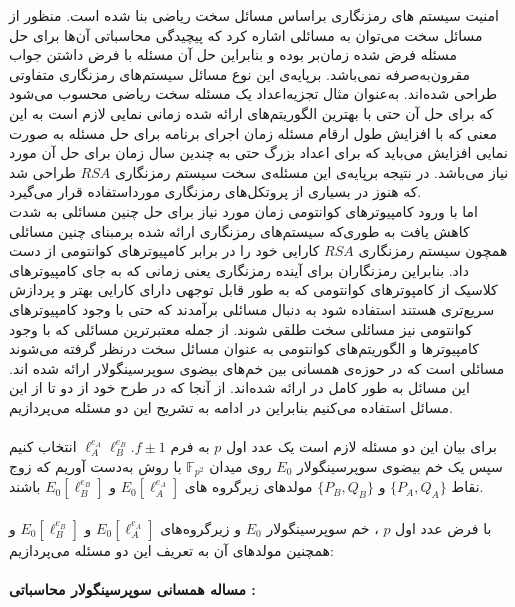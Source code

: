 
امنیت سیستم های رمزنگاری براساس مسائل سخت ریاضی بنا شده است. منظور از مسائل سخت می‌توان به مسائلی اشاره کرد که پیچیدگی محاسباتی آن‌ها برای حل مسئله فرض شده زمان‌بر بوده و بنابراین حل آن مسئله با فرض داشتن جواب مقرون‌به‌صرفه نمی‌باشد. برپایه‌ی این نوع مسائل سیستم‌های رمزنگاری متفاوتی طراحی  شده‌اند. به‌عنوان مثال تجزیه‌اعداد یک مسئله سخت ریاضی محسوب می‌شود که برای حل آن حتی با بهترین الگوریتم‌های ارائه شده زمانی نمایی لازم است به این معنی که با افزایش طول ارقام مسئله زمان اجرای برنامه برای حل مسئله به صورت نمایی افزایش می‌باید که برای اعداد بزرگ حتی به چندین سال زمان برای حل آن مورد نیاز می‌باشد.  در نتیجه برپایه‌ی این مسئله‌ی سخت سیستم رمزنگاری
$RSA$
طراحی شد که هنوز در بسیاری از پروتکل‌های رمزنگاری مورداستفاده قرار می‌گیرد. 
\\
اما با ورود کامپیوترهای کوانتومی زمان مورد نیاز برای حل چنین مسائلی به شدت کاهش یافت به طوری‌که سیستم‌های رمزنگاری ارائه شده برمبنای چنین مسائلی همچون سیستم رمزنگاری 
$RSA$
کارایی خود را  در برابر کامپیوترهای کوانتومی از دست داد. بنابراین رمزنگاران برای آینده رمزنگاری یعنی زمانی که به جای کامپیوترهای کلاسیک از کامپوترهای کوانتومی که به طور قابل توجهی دارای کارایی بهتر و پردازش سریع‌تری هستند  استفاده شود به دنبال مسائلی برآمدند که حتی با وجود کامپیوترهای کوانتومی نیز مسائلی سخت طلقی شوند. از جمله معتبرترین مسائلی که با وجود کامپیوترها و الگوریتم‌های کوانتومی به عنوان مسائل سخت درنظر گرفته می‌شوند مسائلی است که در حوزه‌ی  همسانی بین خم‌های بیضوی سوپرسینگولار ارائه شده اند. این مسائل به طور کامل در 
\cite{jao2014towards}
ارائه شده‌اند. از آنجا که در طرح خود از دو تا از این  مسائل استفاده می‌کنیم بنابراین در ادامه به تشریح این دو مسئله می‌پردازیم.
\\
\\
برای  بیان این دو مسئله لازم است  یک عدد اول 
$p$
به فرم
$\ell_A^{e_A} \ell_B^{e_B} . f \pm 1 $
انتخاب کنیم سپس یک خم بیضوی سوپرسینگولار 
$E_0$
روی میدان
$\mathbb{F}_{p^2}$
با روش
\cite{broker}
 به‌دست آوریم که زوج نقاط
$\{P_A , Q_A \}$
و
$\{ P_B , Q_B \}$
مولدهای زیرگروه های
$E_0[\ell_A^{e_A}]$
و
$E_0[\ell_B^{e_B}]$
باشند.
\\
\\
 با فرض عدد اول
$p$
، خم سوپرسینگولار
$E_0$
و زیرگروه‌های
 $E_0[\ell_A^{e_A}]$
 و
 $E_0[\ell_B^{e_B}]$
 و همچنین مولدهای آن به تعریف این دو مسئله می‌پردازیم:
\\
\\
\textbf{ مساله همسانی سوپرسینگولار محاسباتی :‌}
